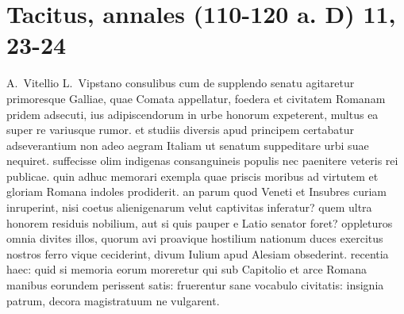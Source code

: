 
\section*{Tacitus, annales (110-120 a. D) 11, 23-24}
\label{sec:annales}

A.~Vitellio L.~Vipstano consulibus cum de supplendo senatu agitaretur primoresque Galliae, quae Comata appellatur, foedera et civitatem Romanam pridem adsecuti, ius adipiscendorum in urbe honorum expeterent, multus ea super re variusque rumor. et studiis diversis apud principem certabatur adseverantium non adeo aegram Italiam ut senatum suppeditare urbi suae nequiret. suffecisse olim indigenas consanguineis populis nec paenitere veteris rei publicae. quin adhuc memorari exempla quae priscis moribus ad virtutem et gloriam Romana indoles prodiderit. an parum quod Veneti et Insubres curiam inruperint, nisi coetus alienigenarum velut captivitas inferatur? quem ultra honorem residuis nobilium, aut si quis pauper e Latio senator foret? oppleturos omnia divites illos, quorum avi proavique hostilium nationum duces exercitus nostros ferro vique ceciderint, divum Iulium apud Alesiam obsederint. recentia haec: quid si memoria eorum moreretur qui sub Capitolio et arce Romana manibus eorundem perissent satis: fruerentur sane vocabulo civitatis: insignia patrum, decora magistratuum ne vulgarent.

